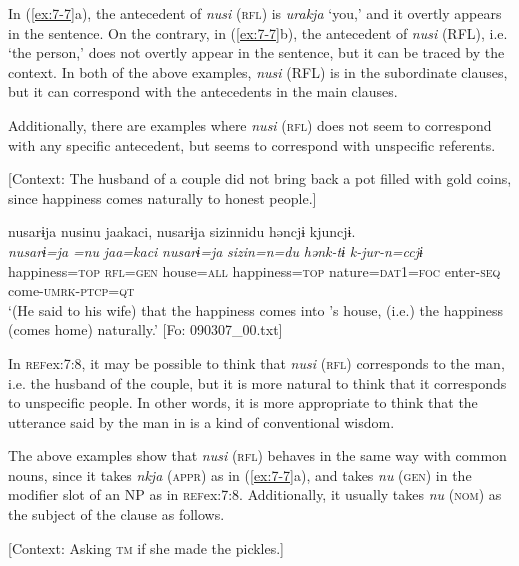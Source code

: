\z
\z

In (\ref{ex:7-7}a), the antecedent of \textit{nusi} (\textsc{rfl}) is \textit{urakja} ‘you,’ and it overtly appears in the sentence. On the contrary, in (\ref{ex:7-7}b), the antecedent of \textit{nusi} (RFL), i.e. ‘the person,’ does not overtly appear in the sentence, but it can be traced by the context. In both of the above examples, \textit{nusi} (RFL) is in the subordinate clauses, but it can correspond with the antecedents in the main clauses.

  Additionally, there are examples where \textit{nusi} (\textsc{rfl}) does not seem to correspond with any specific antecedent, but seems to correspond with unspecific referents.

\ea \label{ex:7:8}  [Context: The husband of a couple did not bring back a pot filled with gold coins, since happiness comes naturally to honest people.]

{\TM}
\glll nusarɨja  nusinu  jaakaci,  nusarɨja  sizinnidu   həncjɨ  kjuncjɨ.\\
\textit{nusarɨ=ja}  \textit{=nu}  \textit{jaa=kaci}  \textit{nusarɨ=ja}  \textit{sizin=n=du} \textit{hənk-tɨ}  \textit{k-jur-n=ccjɨ}\\
    happiness=\textsc{top}  \textsc{rfl}=\textsc{gen}  house=\textsc{all}  happiness=\textsc{top}  nature=\textsc{dat}1=\textsc{foc}  enter-\textsc{seq}  come-\textsc{umrk}-\textsc{ptcp}=\textsc{qt}\\
\glt    ‘(He said to his wife) that the happiness comes into ’s house, (i.e.) the happiness (comes home) naturally.’ [Fo: 090307\_00.txt]

\z

In \textsc{ref}{ex:7:8}, it may be possible to think that \textit{nusi} (\textsc{rfl}) corresponds to the man, i.e. the husband of the couple, but it is more natural to think that it corresponds to unspecific people. In other words, it is more appropriate to think that the utterance said by the man in  is a kind of conventional wisdom.

  The above examples show that \textit{nusi} (\textsc{rfl}) behaves in the same way with common nouns, since it takes \textit{nkja} (\textsc{appr}) as in (\ref{ex:7-7}a), and takes \textit{nu} (\textsc{gen}) in the modifier slot of an NP as in \textsc{ref}{ex:7:8}. Additionally, it usually takes \textit{nu} (\textsc{nom}) as the subject of the clause as follows.

\ea \label{ex:7:9}  [Context: Asking \textsc{tm} if she made the pickles.]

